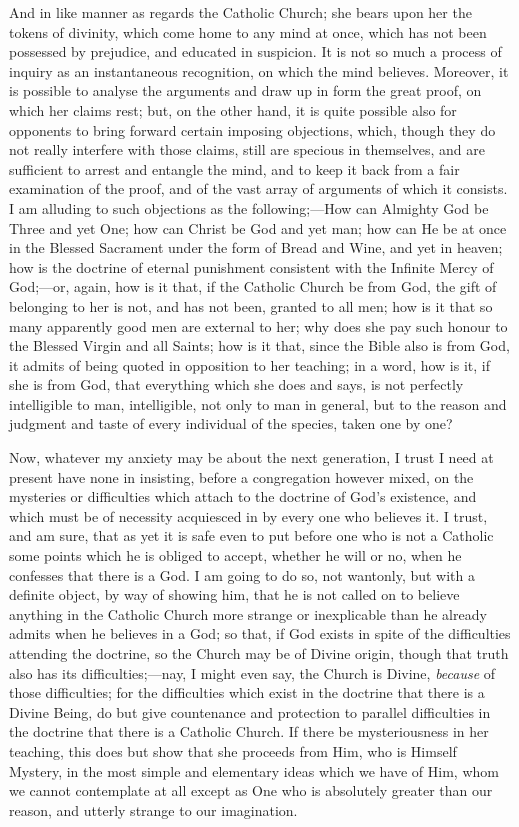 And in like manner as regards the Catholic Church; she bears upon
her the tokens of divinity, which come home to any mind at once, which
has not been possessed by prejudice, and educated in suspicion. It is
not so much a process of inquiry as an instantaneous recognition, on
which the mind believes. Moreover, it is possible to analyse the
arguments and draw up in form the great proof, on which her claims
rest; but, on the other hand, it is quite possible also for opponents
to bring forward certain imposing objections, which, though they do
not really interfere with those claims, still are specious in
themselves, and are sufficient to arrest and entangle the mind, and to
keep it back from a fair examination of the proof, and of the vast
array of arguments of which it consists. I am alluding to such
objections as the following;—How can Almighty God be Three and yet
One; how can Christ be God and yet man; how can He be at once in the
Blessed Sacrament under the form of Bread and Wine, and yet in heaven;
how is the doctrine of eternal punishment consistent with the Infinite
Mercy of God;—or, again, how is it that, if the Catholic Church be
from God, the gift of belonging to her is not, and has not been,
granted to all men; how is it that so many apparently good men are
external to her; why does she pay such honour to the Blessed Virgin
and all Saints; how is it that, since the Bible also is from God, it
admits of being quoted in opposition to her teaching; in a word, how
is it, if she is from God, that everything which she does and says, is
not perfectly intelligible to man, intelligible, not only to man in
general, but to the reason and judgment and taste of every individual
of the species, taken one by one?

Now, whatever my anxiety may be about the next generation, I trust
I need at present have none in insisting, before a congregation
however mixed, on the mysteries or difficulties which attach to the
doctrine of God's existence, and which must be of necessity acquiesced
in by every one who believes it. I trust, and am sure, that as yet it
is safe even to put before one who is not a Catholic some points which
he is obliged to accept, whether he will or no, when he confesses that
there is a God. I am going to do so, not wantonly, but with a definite
object, by way of showing him, that he is not called on to believe
anything in the Catholic Church more strange or inexplicable than he
already admits when he believes in a God; so that, if God exists in
spite of the difficulties attending the doctrine, so the Church may be
of Divine origin, though that truth also has its difficulties;—nay,
I might even say, the Church is Divine, \emph{because} of those
difficulties; for the difficulties which exist in the doctrine that
there is a Divine Being, do but give countenance and protection to
parallel difficulties in the doctrine that there is a Catholic Church.
If there be mysteriousness in her teaching, this does but show that
she proceeds from Him, who is Himself Mystery, in the most simple and
elementary ideas which we have of Him, whom we cannot contemplate at
all except as One who is absolutely greater than our reason, and
utterly strange to our imagination.

